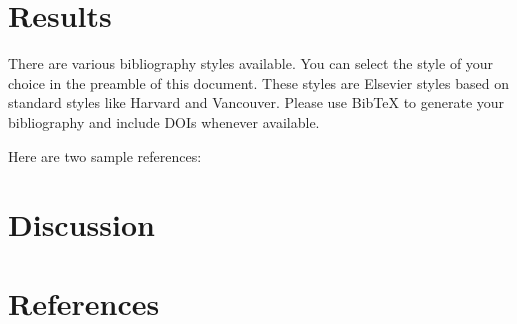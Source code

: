 \documentclass[]{elsarticle} %
\begin{document}
\hypertarget{results}{%
\section{Results}\label{results}}

There are various bibliography styles available. You can select the
style of your choice in the preamble of this document. These styles are
Elsevier styles based on standard styles like Harvard and Vancouver.
Please use BibTeX to generate your bibliography and include DOIs
whenever available.

Here are two sample references:

\hypertarget{discussion}{%
\section{Discussion}\label{discussion}}

\hypertarget{references}{%
\section*{References}\label{references}}
\end{document}
